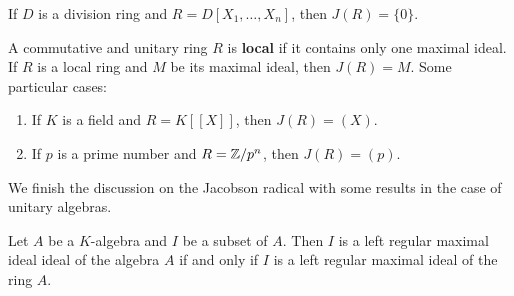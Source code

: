 
\begin{exercise}
    If $D$ is a division ring and $R=D[X_1,\dots,X_n]$, then
    $J(R)=\{0\}$. 
\end{exercise}


\begin{example}
    A commutative and unitary ring $R$ is \textbf{local} if it contains
    only one maximal ideal. 
	If $R$ is a local ring and $M$ be its maximal ideal, then $J(R)=M$. Some particular cases: 
	\begin{enumerate}
		\item If $K$ is a field and $R=K\left[ [X] \right]$, then $J(R)=(X)$. 
		\item If $p$ is a prime number and $R=\mathbb{Z}/p^n$, then $J(R)=(p)$. 
	\end{enumerate}
\end{example}

We finish the discussion on the Jacobson radical with 
some results in the case of unitary algebras. 

\begin{theorem}
	Let $A$ be a $K$-algebra and $I$ be a subset of $A$. Then $I$ is 
	a left regular maximal ideal ideal of the algebra $A$ if and only if $I$ is 
	a left regular maximal ideal of the ring $A$.
\end{theorem}

